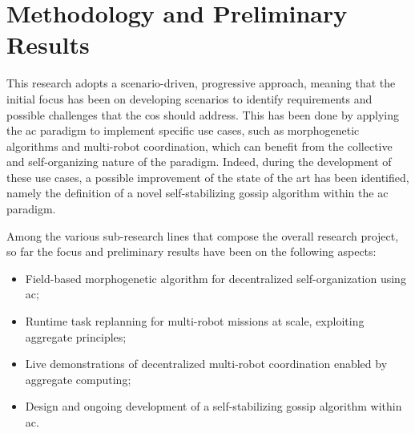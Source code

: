 \documentclass[runningheads]{llncs}
\begin{document}
    \section{Methodology and Preliminary Results}\label{sec:methodology}

    This research adopts a scenario-driven, progressive approach,
    meaning that the initial focus has been on developing scenarios to identify requirements and possible challenges
    that the \ac{cos} should address.
    This has been done by applying the \ac{ac} paradigm to implement specific use cases,
    such as morphogenetic algorithms and multi-robot coordination,
    which can benefit from the collective and self-organizing nature of the paradigm.
    Indeed,
    during the development of these use cases,
    a possible improvement of the state of the art has been identified,
    namely the definition of a novel self-stabilizing gossip algorithm within the \ac{ac} paradigm.

    Among the various sub-research lines that compose the overall research project,
    so far the focus and preliminary results have been on the following aspects:
    \begin{itemize}
        \item Field-based morphogenetic algorithm for decentralized self-organization using \ac{ac};
        \item Runtime task replanning for multi-robot missions at scale, exploiting aggregate principles;
        \item Live demonstrations of decentralized multi-robot coordination enabled by aggregate computing;
        \item Design and ongoing development of a self-stabilizing gossip algorithm within \ac{ac}.
    \end{itemize}
\end{document}
